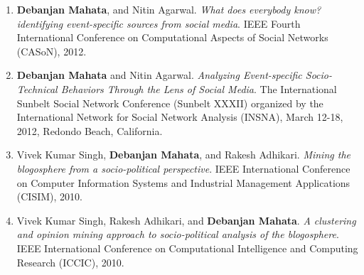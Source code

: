 \begin{enumerate}
\item \textbf{Debanjan Mahata}, and Nitin Agarwal. \textit{What does everybody know? identifying event-specific sources from social media}. IEEE Fourth International Conference on Computational Aspects of Social Networks (CASoN), 2012.

\item \textbf{Debanjan Mahata} and Nitin Agarwal. \textit{Analyzing Event-specific Socio-Technical Behaviors Through the Lens of Social Media}. The International Sunbelt Social Network Conference (Sunbelt XXXII) organized by the International Network for Social Network Analysis (INSNA), March 12-18, 2012, Redondo Beach, California.

\item Vivek Kumar Singh, \textbf{Debanjan Mahata}, and Rakesh Adhikari. \textit{Mining the blogosphere from a socio-political perspective}. IEEE International Conference on Computer Information Systems and Industrial Management Applications (CISIM), 2010.

\item Vivek Kumar Singh, Rakesh Adhikari, and \textbf{Debanjan Mahata}. \textit{A clustering and opinion mining approach to socio-political analysis of the blogosphere}. IEEE International Conference on Computational Intelligence and Computing Research (ICCIC), 2010.

\end{enumerate}


